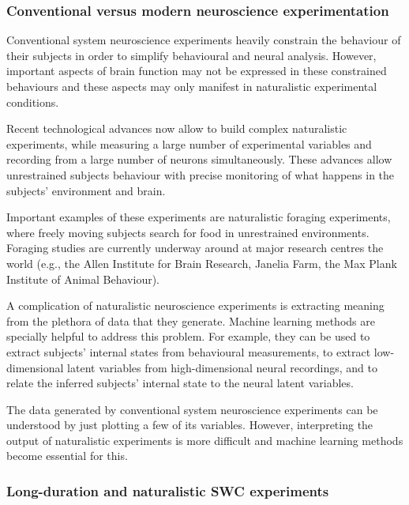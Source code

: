 \subsubsection*{Conventional versus modern neuroscience experimentation}

Conventional system neuroscience experiments heavily constrain the behaviour of
their subjects in order to simplify behavioural and neural analysis.  However,
important aspects of brain function may not be expressed in these constrained
behaviours and these aspects may only manifest in naturalistic experimental
conditions.


Recent technological advances now allow to build complex naturalistic
experiments, while measuring a large number of experimental variables and
recording from a large number of neurons simultaneously. These advances
allow unrestrained subjects behaviour with precise monitoring of what happens in
the subjects' environment and brain.

Important examples of these experiments are naturalistic foraging experiments,
where freely moving subjects search for food in unrestrained environments.
Foraging studies are currently underway around at major research centres the
world (e.g., the Allen Institute for Brain Research, Janelia Farm, the Max
Plank Institute of Animal Behaviour).

A complication of naturalistic neuroscience experiments is extracting meaning
from the plethora of data that they generate. Machine learning methods are
specially helpful to address this problem. For example, they can be used to
extract subjects' internal states from behavioural measurements, to extract
low-dimensional latent variables from high-dimensional neural recordings, and
to relate the inferred subjects' internal state to the neural latent variables.

The data generated by conventional system neuroscience experiments can be
understood by just plotting a few of its variables. However, interpreting the output
of naturalistic experiments is more difficult and machine learning methods
become essential for this.

\subsubsection*{Long-duration and naturalistic SWC experiments}

